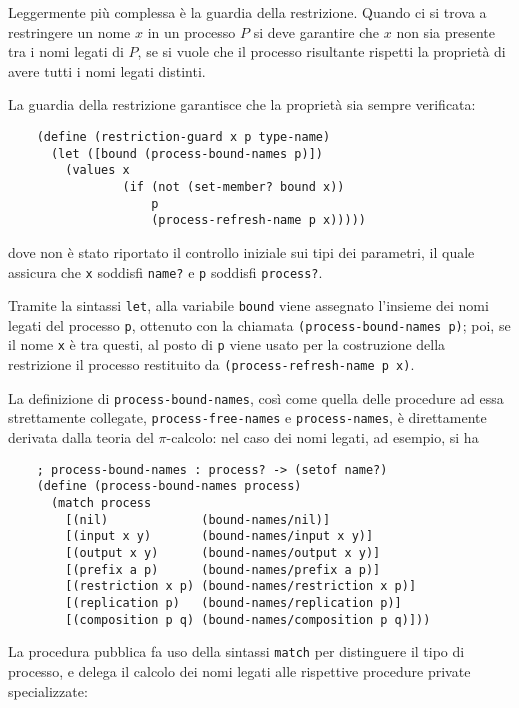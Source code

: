 Leggermente pi\`u complessa \`e la guardia della restrizione. Quando ci si
trova a restringere un nome $x$ in un processo $P$ si deve garantire che
$x$ non sia presente tra i nomi legati di $P$, se si vuole che il processo
risultante rispetti la propriet\`a di avere tutti i nomi legati distinti.

La guardia della restrizione garantisce che la propriet\`a sia sempre
verificata:

\begin{lstlisting}
    (define (restriction-guard x p type-name)
      (let ([bound (process-bound-names p)])
        (values x
                (if (not (set-member? bound x))
                    p
                    (process-refresh-name p x)))))
\end{lstlisting}

dove non \`e stato riportato il controllo iniziale sui tipi dei parametri,
il quale assicura che \lstinline{x} soddisfi \lstinline{name?} e
\lstinline{p} soddisfi \lstinline{process?}.

Tramite la sintassi \lstinline{let}, alla variabile \lstinline{bound} viene
assegnato l'insieme dei nomi legati del processo \lstinline{p}, ottenuto
con la chiamata \lstinline{(process-bound-names p)}; poi, se il nome
\lstinline{x} \`e tra questi, al posto di \lstinline{p} viene usato per la
costruzione della restrizione il processo restituito da
\lstinline{(process-refresh-name p x)}.

La definizione di \lstinline{process-bound-names}, cos\`i come quella delle
procedure ad essa strettamente collegate, \lstinline{process-free-names} e
\lstinline{process-names}, \`e direttamente derivata dalla teoria del
$\pi$-calcolo: nel caso dei nomi legati, ad esempio, si ha

\begin{lstlisting}
    ; process-bound-names : process? -> (setof name?)
    (define (process-bound-names process)
      (match process
        [(nil)             (bound-names/nil)]
        [(input x y)       (bound-names/input x y)]
        [(output x y)      (bound-names/output x y)]
        [(prefix a p)      (bound-names/prefix a p)]
        [(restriction x p) (bound-names/restriction x p)]
        [(replication p)   (bound-names/replication p)]
        [(composition p q) (bound-names/composition p q)]))
\end{lstlisting}

La procedura pubblica fa uso della sintassi \lstinline{match} per distinguere
il tipo di processo, e delega il calcolo dei nomi legati alle rispettive
procedure private specializzate:


